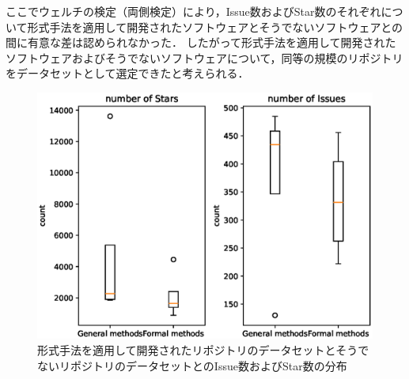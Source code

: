 \documentclass[main]{subfiles}
\begin{document}
ここでウェルチの検定（両側検定）により，Issue数およびStar数のそれぞれについて形式手法を適用して開発されたソフトウェアとそうでないソフトウェアとの間に有意な差は認められなかった．
したがって形式手法を適用して開発されたソフトウェアおよびそうでないソフトウェアについて，同等の規模のリポジトリをデータセットとして選定できたと考えられる．

\begin{figure}[p]
	\centering
	\includegraphics[width=\hsize]{figures/boxplot.eps}
	\caption{形式手法を適用して開発されたリポジトリのデータセットとそうでないリポジトリのデータセットとのIssue数およびStar数の分布}
	\label{fig:boxplot}
\end{figure}
\end{document}
